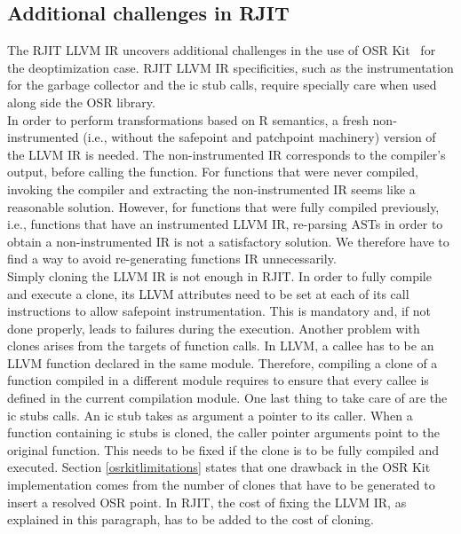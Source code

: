 \subsection{Additional challenges in RJIT}\label{additionalchallenges}

The RJIT LLVM IR uncovers additional challenges in the use of OSR Kit~\cite{OSRKit} for the deoptimization case.
RJIT LLVM IR specificities, such as the instrumentation for the garbage collector and the ic stub calls, require specially care when used along side the OSR library.\\

In order to perform transformations based on R semantics, a fresh non-instrumented (i.e., without the safepoint and patchpoint machinery) version of the LLVM IR is needed.
The non-instrumented IR corresponds to the compiler's output, before calling the  function.
For functions that were never compiled, invoking the compiler and extracting the non-instrumented IR seems like a reasonable solution.
However, for functions that were fully compiled previously, i.e., functions that have an instrumented LLVM IR, re-parsing ASTs in order to obtain a non-instrumented IR is not a satisfactory solution.
We therefore have to find a way to avoid re-generating functions IR unnecessarily.\\

Simply cloning the LLVM IR is not enough in RJIT.
In order to fully compile and execute a clone, its LLVM attributes need to be set at each of its call instructions to allow safepoint instrumentation.
This is mandatory and, if not done properly, leads to failures during the execution.
Another problem with clones arises from the targets of function calls.
In LLVM, a callee has to be an LLVM function declared in the same module.
Therefore, compiling a clone of a function compiled in a different module requires to ensure that every callee is defined in the current compilation module.
One last thing to take care of are the ic stubs calls.
An ic stub takes as argument a pointer to its caller.
When a function containing ic stubs is cloned, the caller pointer arguments point to the original function.
This needs to be fixed if the clone is to be fully compiled and executed.
Section \ref{osrkitlimitations} states that one drawback in the OSR Kit implementation comes from the number of clones that have to be generated to insert a resolved OSR point.
In RJIT, the cost of fixing the LLVM IR, as explained in this paragraph, has to be added to the cost of cloning.\\


